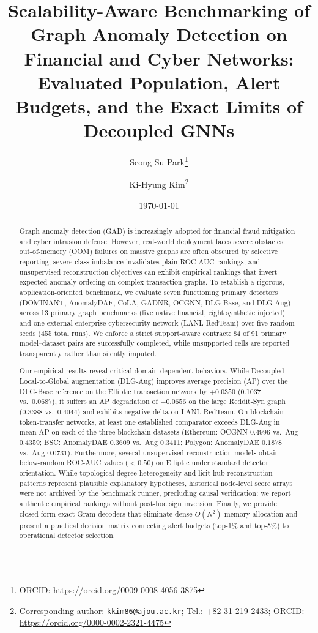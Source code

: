 \documentclass[11pt,a4paper]{article}
\title{\textbf{\Large Scalability-Aware Benchmarking of Graph Anomaly Detection on Financial and Cyber Networks: Evaluated Population, Alert Budgets, and the Exact Limits of Decoupled GNNs}}
\author[1]{Seong-Su Park\thanks{ORCID: \url{https://orcid.org/0009-0008-4056-3875}}}
\author[2]{Ki-Hyung Kim\thanks{Corresponding author: \texttt{kkim86@ajou.ac.kr}; Tel.: +82-31-219-2433; ORCID: \url{https://orcid.org/0000-0002-2321-4475}}}
\affil[1]{\small Department of Computer Engineering, Ajou University, Suwon 16499, Republic of Korea; \texttt{parky@ajou.ac.kr}}
\affil[2]{\small Department of Cyber Security, Ajou University, Suwon 16499, Republic of Korea; \texttt{kkim86@ajou.ac.kr}}
\date{\today}
\begin{document}
\maketitle

\begin{abstract}
Graph anomaly detection (GAD) is increasingly adopted for financial fraud mitigation and cyber intrusion defense. However, real-world deployment faces severe obstacles: out-of-memory (OOM) failures on massive graphs are often obscured by selective reporting, severe class imbalance invalidates plain ROC-AUC rankings, and unsupervised reconstruction objectives can exhibit empirical rankings that invert expected anomaly ordering on complex transaction graphs. To establish a rigorous, application-oriented benchmark, we evaluate seven functioning primary detectors (DOMINANT, AnomalyDAE, CoLA, GADNR, OCGNN, DLG-Base, and DLG-Aug) across 13 primary graph benchmarks (five native financial, eight synthetic injected) and one external enterprise cybersecurity network (LANL-RedTeam) over five random seeds (455 total runs). We enforce a strict support-aware contract: 84 of 91 primary model--dataset pairs are successfully completed, while unsupported cells are reported transparently rather than silently imputed. 

Our empirical results reveal critical domain-dependent behaviors. While Decoupled Local-to-Global augmentation (DLG-Aug) improves average precision (AP) over the DLG-Base reference on the Elliptic transaction network by $+0.0350$ (0.1037 vs.\ 0.0687), it suffers an AP degradation of $-0.0656$ on the large Reddit-Syn graph (0.3388 vs.\ 0.4044) and exhibits negative delta on LANL-RedTeam. On blockchain token-transfer networks, at least one established comparator exceeds DLG-Aug in mean AP on each of the three blockchain datasets (Ethereum: OCGNN $0.4996$ vs.\ Aug $0.4359$; BSC: AnomalyDAE $0.3609$ vs.\ Aug $0.3411$; Polygon: AnomalyDAE $0.1878$ vs.\ Aug $0.0731$). Furthermore, several unsupervised reconstruction models obtain below-random ROC-AUC values ($<0.50$) on Elliptic under standard detector orientation. While topological degree heterogeneity and licit hub reconstruction patterns represent plausible explanatory hypotheses, historical node-level score arrays were not archived by the benchmark runner, precluding causal verification; we report authentic empirical rankings without post-hoc sign inversion. Finally, we provide closed-form exact Gram decoders that eliminate dense $O(N^2)$ memory allocation and present a practical decision matrix connecting alert budgets (top-1\% and top-5\%) to operational detector selection.
\end{abstract}
\end{document}
